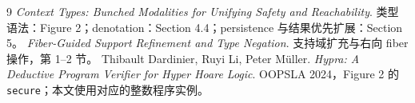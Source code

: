 \documentclass[UTF8,a4paper,11pt,fontset=fandol]{ctexart}
\begin{document}
\begin{thebibliography}{9}
 \emph{Context Types: Bunched Modalities for Unifying Safety and Reachability}.
类型语法：Figure 2；denotation：Section 4.4；persistence 与结果优先扩展：Section 5。
 \emph{Fiber-Guided Support Refinement and Type Negation}.
支持域扩充与右向 fiber 操作，第 1--2 节。
 Thibault Dardinier, Ruyi Li, Peter M\"uller.
\emph{Hypra: A Deductive Program Verifier for Hyper Hoare Logic}.
OOPSLA 2024，Figure 2 的 \texttt{secure}；本文使用对应的整数程序实例。
\end{thebibliography}
\end{document}
